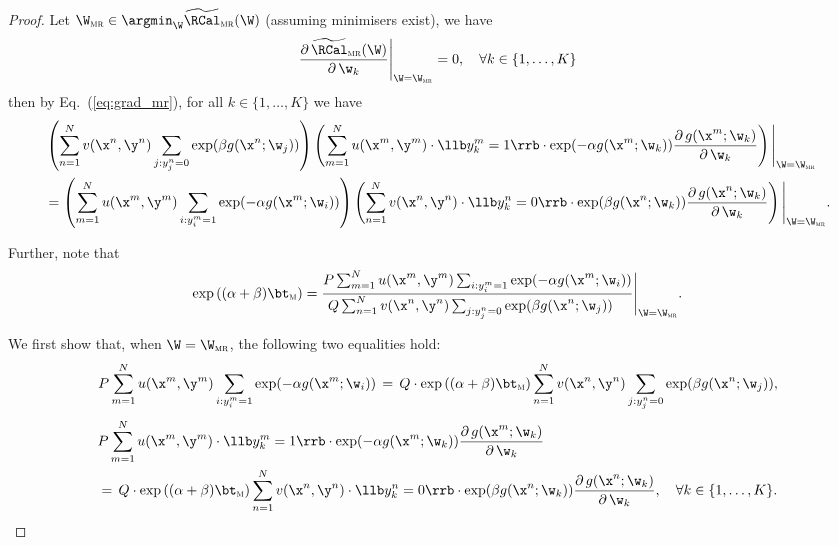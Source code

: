 \begin{proof}
Let $\W_\textsc{mr} \in \argmin_\W \widetilde\RCal_\textsc{mr}(\W)$ (assuming minimisers exist), we have
$$
\frac{\partial \, \widetilde\RCal_\textsc{mr}(\W)} {\partial \, \w_k} \Bigg|_{\W = \W_\textsc{mr}} = 0,
\quad \forall k \in \{1,\dots,K\}
$$
then by Eq.~(\ref{eq:grad_mr}), for all $k \in \{1,\dots,K\}$ we have
\begin{equation}
\label{eq:grad_mr_eq0}
\begin{aligned}
&  \left( \sum_{n=1}^N v(\x^n, \y^n) \sum_{j: y_j^n = 0} \exp( \beta  g(\x^n; \w_j)) \right)
   \left( \sum_{m=1}^N u(\x^m, \y^m) \cdot \llb y_k^m = 1 \rrb \cdot \exp(-\alpha g(\x^m; \w_k)) 
   \frac{\partial \, g(\x^m; \w_k)}{\partial \, \w_k} \right)
   \Bigg|_{\W = \W_\textsc{mr}} \\
&= \left( \sum_{m=1}^N u(\x^m, \y^m) \sum_{i: y_i^m = 1} \exp(-\alpha g(\x^m; \w_i)) \right)
   \left( \sum_{n=1}^N v(\x^n, \y^n) \cdot \llb y_k^n = 0 \rrb \cdot \exp( \beta  g(\x^n; \w_k)) 
   \frac{\partial \, g(\x^n; \w_k)}{\partial \, \w_k} \right)
   \Bigg|_{\W = \W_\textsc{mr}}.
\end{aligned}
\end{equation}

Further, note that 
\begin{equation}
\label{eq:bias_ml}
\exp \left( (\alpha + \beta) \bt_\textsc{m} \right) 
= \frac{P \sum_{m=1}^N u(\x^m, \y^m) \sum_{i: y_i^m = 1} \exp(-\alpha g(\x^m; \w_i))}
       {Q \sum_{n=1}^N v(\x^n, \y^n) \sum_{j: y_j^n = 0} \exp( \beta  g(\x^n; \w_j)) \hspace{1em}} \Bigg|_{\W = \W_\textsc{mr}}.
\end{equation}

We first show that, when $\W = \W_\textsc{mr}$, the following two equalities hold:
\begin{equation}
\label{eq:skew_ml_equal}
P \sum_{m=1}^N u(\x^m, \y^m) \sum_{i: y_i^m = 1} \exp(-\alpha g(\x^m; \w_i)) 
\, = \,
Q \cdot \exp \left( (\alpha + \beta) \bt_\textsc{m} \right)
  \sum_{n=1}^N v(\x^n, \y^n) \sum_{j: y_j^n = 0} \exp( \beta  g(\x^n; \w_j)),
\end{equation}
%
\begin{equation}
\label{eq:grad_mc_equal}
\begin{aligned}
&P \sum_{m=1}^N u(\x^m, \y^m) \cdot \llb y_k^m = 1 \rrb \cdot \exp(-\alpha g(\x^m; \w_k)) \frac{\partial \, g(\x^m; \w_k)}{\partial \, \w_k} \\
&= \, Q \cdot \exp \left( (\alpha + \beta) \bt_\textsc{m} \right)
   \sum_{n=1}^N v(\x^n, \y^n) \cdot \llb y_k^n = 0 \rrb \cdot \exp( \beta  g(\x^n; \w_k)) \frac{\partial \, g(\x^n; \w_k)}{\partial \, \w_k}, 
   \quad \forall k \in \{1,\dots,K\}.
\end{aligned}
\end{equation}


\end{proof}
